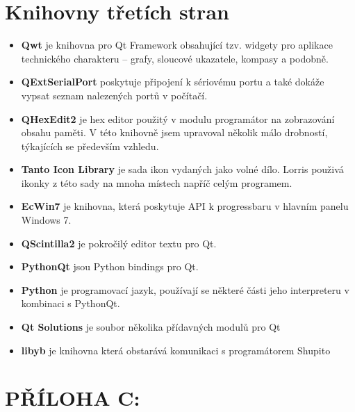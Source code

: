 \documentclass[12pt, a4paper, oneside]{article}
\begin{document}
\section*{Knihovny třetích stran}
\begin{itemize}
    \item {\bf Qwt}\cite{qwt} je knihovna pro Qt Framework obsahující tzv. widgety pro aplikace technického charakteru -- grafy, sloucové ukazatele, kompasy a podobně.
    \item {\bf QExtSerialPort}\cite{qext} poskytuje připojení k sériovému portu a také dokáže vypsat seznam nalezených portů v počítačí.
    \item {\bf QHexEdit2}\cite{qhex} je hex editor použitý v modulu programátor na zobrazování obsahu paměti. V této knihovně jsem upravoval několik málo drobností, týkajících se především vzhledu.
    \item {\bf Tanto Icon Library}\cite{tango} je sada ikon vydaných jako volné dílo. Lorris použivá ikonky z této sady na mnoha místech napříč celým programem.
    \item {\bf EcWin7}\cite{ecwin7} je knihovna, která poskytuje API k progressbaru v hlavním panelu Windows 7.
    \item {\bf QScintilla2}\cite{qsci} je pokročilý editor textu pro Qt.
    \item {\bf PythonQt}\cite{pythonqt} jsou Python bindings pro Qt.
    \item {\bf Python}\cite{python} je programovací jazyk, používají se některé části jeho interpreteru v kombinaci s PythonQt.
    \item {\bf Qt Solutions}\cite{qtsolutions} je soubor několika přídavných modulů pro Qt
    \item {\bf libyb}\cite{libyb} je knihovna která obstarává komunikaci s programátorem Shupito
\end{itemize}

\section*{PŘÍLOHA C:}
\end{document}
